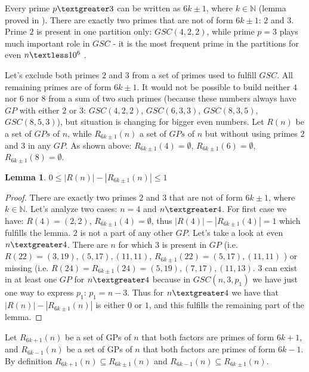 \documentclass[10pt,twocolumn]{article}
\newtheorem{lemma}[theorem]{Lemma}
\begin{document}
Every prime $p \textgreater 3$ can be written as $6k \pm 1$, where $k \in \mathbb{N}$ (lemma proved in \cite{barylski2018}). There are exactly two primes that are not of form $6k \pm 1$: $2$ and $3$. Prime $2$ is present in one partition only: $GSC(4, 2, 2)$, while prime $p = 3$ plays much important role in $GSC$ - it is the most frequent prime in the partitions for even $n \textless 10^6$ \cite{barylski2018}. \par
Let's exclude both primes $2$ and $3$ from a set of primes used to fulfill $GSC$. All remaining primes are of form $6k \pm 1$. It would not be possible to build neither $4$ nor $6$ nor $8$ from a sum of two such primes (because these numbers always have $GP$ with either $2$ or $3$: $GSC(4, 2, 2)$, $GSC(6, 3, 3)$, $GSC(8, 3, 5)$, $GSC(8, 5, 3)$), but situation is changing for bigger even numbers. Let $R(n)$ be a set of $GPs$ of $n$, while  $R_{6k \pm 1}(n)$ a set of $GPs$ of $n$ but without using primes $2$ and $3$ in any $GP$. As shown above: $R_{6k \pm 1}(4) = \emptyset$, $R_{6k \pm 1}(6) = \emptyset$, $R_{6k \pm 1}(8) = \emptyset$.

\begin{lemma}
$0 \leq \left\vert R(n)\right\vert - \left\vert R_{6k \pm 1}(n)\right\vert \leq 1$
\end{lemma}
\begin{proof}
There are exactly two primes $2$ and $3$ that are not of form $6k \pm 1$, where $k \in \mathbb{N}$. Let's analyze two cases: $n = 4$ and $n \textgreater 4$. For first case we have: $R(4) = (2,2)$, $R_{6k \pm 1}(4) = \emptyset$, thus $\left\vert R(4)\right\vert - \left\vert R_{6k \pm 1}(4)\right\vert = 1$ which fulfills the lemma. $2$ is not a part of any other $GP$. Let's take a look at even $n \textgreater 4$. There are $n$ for which $3$ is present in $GP$ (i.e. $R(22) = (3,19), (5,17), (11,11)$, $R_{6k \pm 1}(22) = (5,17), (11,11)$ ) or missing (i.e. $R(24) = R_{6k \pm 1}(24) = (5,19), (7,17), (11,13)$. $3$ can exist in at least one $GP$ for $n \textgreater 4$ because in $GSC(n, 3, p_1)$ we have just one way to express $p_1$: $p_1 = n - 3$. Thus for $n \textgreater 4$ we have that $\left\vert R(n)\right\vert - \left\vert R_{6k \pm 1}(n)\right\vert$ is either $0$ or $1$, and this fulfills the remaining part of the lemma.
\end{proof}

 Let $R_{6k + 1}(n)$ be a set of GPs of $n$ that both factors are primes of form $6k + 1$, and $R_{6k - 1}(n)$ be a set of GPs of $n$ that both factors are primes of form $6k - 1$. By definition $R_{6k + 1}(n) \subseteq R_{6k \pm 1}(n)$ and $R_{6k - 1}(n) \subseteq R_{6k \pm 1}(n)$.
\end{document}
